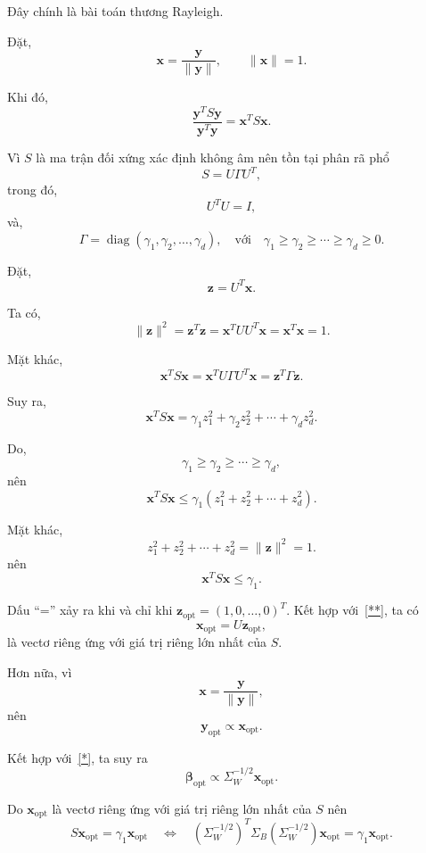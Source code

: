 Đây chính là bài toán thương Rayleigh.

Đặt,
\[
\bm{x}
=
\frac{\bm{y}}{\|\bm{y}\|},
\qquad
\|\bm{x}\|=1.
\]

Khi đó,
\[
\frac{\bm{y}^T S \bm{y}}{\bm{y}^T\bm{y}}
=
\bm{x}^T S \bm{x}.
\]

Vì $S$ là ma trận đối xứng xác định không âm nên tồn tại phân rã phổ
\[
S
=
U\Gamma U^T,
\]
trong đó,
\[
U^TU=I,
\]
và,
\[
\Gamma
=
\operatorname{diag}(\gamma_1,\gamma_2,\ldots,\gamma_d),
\quad \text{với} \quad
\gamma_1\geq \gamma_2\geq \cdots \geq \gamma_d \geq 0.
\]

Đặt,
\begin{equation}
	\bm{z}
	=
	U^T\bm{x}.
	\tag{**}
	\label{**}
\end{equation}

Ta có,
\[
\|\bm{z}\|^2
=
\bm{z}^T\bm{z}
=
\bm{x}^TUU^T\bm{x}
=
\bm{x}^T\bm{x}
=
1.
\]

Mặt khác,
\[
\bm{x}^T S \bm{x}
=
\bm{x}^T U\Gamma U^T\bm{x}
=
\bm{z}^T\Gamma \bm{z}.
\]

Suy ra,
\[
\bm{x}^T S \bm{x}
=
\gamma_1z_1^2
+
\gamma_2z_2^2
+
\cdots
+
\gamma_dz_d^2.
\]

Do,
\[
\gamma_1\geq \gamma_2\geq \cdots \geq \gamma_d,
\]
nên
\[
\bm{x}^T S \bm{x}
\leq
\gamma_1(z_1^2+z_2^2+\cdots+z_d^2).
\]

Mặt khác,
\[
z_1^2+z_2^2+\cdots+z_d^2
=
\|\bm{z}\|^2
=
1.
\]
nên
\[
\bm{x}^T S \bm{x}
\leq
\gamma_1.
\]

Dấu ``='' xảy ra khi và chỉ khi $\bm{z}_{\text{opt}}=(1,0,\ldots,0)^T$. Kết hợp với~\eqref{**}, ta có 
\[
\bm{x}_{\text{opt}}
=
U\bm{z}_{\text{opt}},
\]
là vectơ riêng ứng với giá trị riêng lớn nhất của $S$.

Hơn nữa, vì
\[
\bm{x}
=
\frac{\bm{y}}{\|\bm{y}\|},
\]
nên
\[
\bm{y}_{\text{opt}}
\propto
\bm{x}_{\text{opt}}.
\]

Kết hợp với~\eqref{*}, ta suy ra
\begin{equation}
	\bm{\beta}_{\text{opt}}
	\propto
	\Sigma_W^{-1/2}\bm{x}_{\text{opt}}.
	\tag{***}
	\label{***}
\end{equation}

Do $\bm{x}_{\text{opt}}$ là vectơ riêng ứng với giá trị riêng lớn nhất của $S$ nên
\[
S\bm{x}_{\text{opt}}
=
\gamma_1\bm{x}_{\text{opt}}
\quad \Longleftrightarrow \quad
\left(\Sigma_W^{-1/2}\right)^T
\Sigma_B
\left(\Sigma_W^{-1/2}\right)
\bm{x}_{\text{opt}}
=
\gamma_1\bm{x}_{\text{opt}}.
\]


